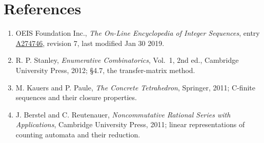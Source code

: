 \documentclass[11pt]{article}
\theoremstyle{definition}
\begin{document}
\section{References}

\begin{enumerate}

\item OEIS Foundation Inc., \emph{The On-Line Encyclopedia of Integer Sequences}, entry \href{https://oeis.org/A274746}{A274746}, revision 7, last modified Jan 30 2019.

\item R. P. Stanley, \emph{Enumerative Combinatorics}, Vol.~1, 2nd ed., Cambridge University Press, 2012; \S4.7, the transfer-matrix method.

\item M. Kauers and P. Paule, \emph{The Concrete Tetrahedron}, Springer, 2011; C-finite sequences and their closure properties.

\item J. Berstel and C. Reutenauer, \emph{Noncommutative Rational Series with Applications}, Cambridge University Press, 2011; linear representations of counting automata and their reduction.

\end{enumerate}
\end{document}
